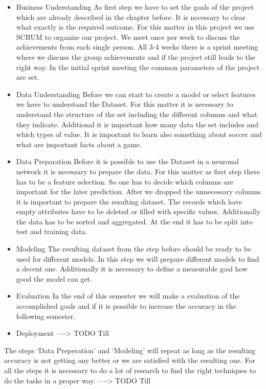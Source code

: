 \begin{itemize}
\item Business Understanding \newline
As first step we have to set the goals of the project which are already described in the chapter before. It is necessary to clear what exactly is the required outcome. For this matter in this project we use SCRUM to organize our project. We meet once per week to discuss the achievements from each single person. All 3-4 weeks there is a sprint meeting where we discuss the group achievements and if the project still leads to the right way. In the initial sprint meeting the common parameters of the project are set. 
\item Data Understanding \newline
Before we can start to create a model or select features we have to understand the Dataset. For this matter it is necessary to understand the structure of the set including the different columns and what they indicate. Additional it is important how many data the set includes and which types of value. It is important to learn also something about soccer and what are important facts about a game. 
\item Data Preparation \newline
 Before it is possible to use the Dataset in a neuronal network it is necessary to prepare the data. For this matter as first step there has to be a feature selection. So one has to decide which columns are important for the later prediction. After we dropped the unnecessary columns it is important to prepare the resulting dataset. The records which have empty attributes have to be deleted or filled with specific values. Additionally the data has to be sorted and aggregated. At the end it has to be split into test and training data. 
 \item Modeling \newline
 The resulting dataset from the step before should be ready to be used for different models. In this step we will prepare different models to find a decent one. Additionally it is necessary to define a measurable goal how good the model can get.   
\item Evaluation \newline
In the end of this semester we will make a evaluation of the accomplished goals and if it is possible to increase the accuracy in the following semester.  
\item Deployment \newline
----> TODO Till
\end{itemize}

The steps `Data Preperation' and `Modeling' will repeat as long as the resulting accuracy is not getting any better or we are satisfied with the resulting one. For all the steps it is necessary to do a lot of research to find the right techniques to do the tasks in a proper way. 
----> TODO Till